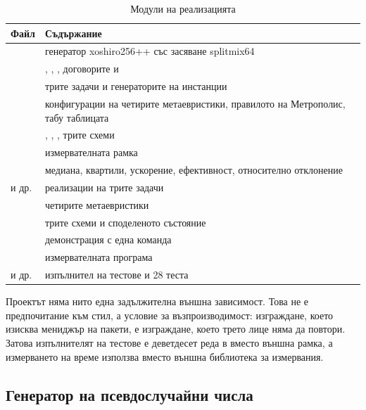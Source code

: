 \begin{table}[H]
\centering
\caption{Модули на реализацията}
\label{tab:modules}
\begin{adjustbox}{max width=\textwidth}
\begin{tabular}{@{}L{5.0cm}L{9.0cm}@{}}
\toprule
\textbf{Файл} & \textbf{Съдържание} \\
\midrule
{} & генератор xoshiro256++ със засяване splitmix64 \\
 & , , , договорите  и  \\
 & трите задачи и генераторите на инстанции \\
 & конфигурации на четирите метаевристики, правилото на Метрополис, табу таблицата \\
 & , , , трите схеми \\
 & измервателната рамка \\
 & медиана, квартили, ускорение, ефективност, относително отклонение \\
 и др. & реализации на трите задачи \\
 & четирите метаевристики \\
 & трите схеми и споделеното състояние \\
 & демонстрация с една команда \\
 & измервателната програма \\
 и др. & изпълнител на тестове и 28 теста \\
\bottomrule
\end{tabular}
\end{adjustbox}
\end{table}

Проектът няма нито една задължителна външна зависимост. Това не е предпочитание към
стил, а условие за възпроизводимост: изграждане, което изисква мениджър на пакети,
е изграждане, което трето лице няма да повтори. Затова изпълнителят на тестове е
деветдесет реда в  вместо външна рамка, а измерването на време
използва  вместо външна библиотека за измервания.

\subsection{Генератор на псевдослучайни числа}
\label{subsec:impl-rng}

